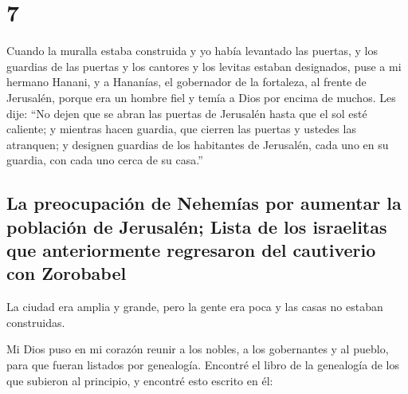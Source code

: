 \hypertarget{section-6}{%
\section{7}\label{section-6}}

 Cuando la muralla estaba construida y yo había levantado
las puertas, y los guardias de las puertas y los cantores y los levitas
estaban designados,  puse a mi hermano Hanani, y a
Hananías, el gobernador de la fortaleza, al frente de Jerusalén, porque
era un hombre fiel y temía a Dios por encima de muchos. 
Les dije: ``No dejen que se abran las puertas de Jerusalén hasta que el
sol esté caliente; y mientras hacen guardia, que cierren las puertas y
ustedes las atranquen; y designen guardias de los habitantes de
Jerusalén, cada uno en su guardia, con cada uno cerca de su casa.''

\hypertarget{la-preocupaciuxf3n-de-nehemuxedas-por-aumentar-la-poblaciuxf3n-de-jerusaluxe9n-lista-de-los-israelitas-que-anteriormente-regresaron-del-cautiverio-con-zorobabel}{%
\subsection{La preocupación de Nehemías por aumentar la población de
Jerusalén; Lista de los israelitas que anteriormente regresaron del
cautiverio con
Zorobabel}\label{la-preocupaciuxf3n-de-nehemuxedas-por-aumentar-la-poblaciuxf3n-de-jerusaluxe9n-lista-de-los-israelitas-que-anteriormente-regresaron-del-cautiverio-con-zorobabel}}

 La ciudad era amplia y grande, pero la gente era poca y
las casas no estaban construidas.

 Mi Dios puso en mi corazón reunir a los nobles, a los
gobernantes y al pueblo, para que fueran listados por genealogía.
Encontré el libro de la genealogía de los que subieron al principio, y
encontré esto escrito en él:


